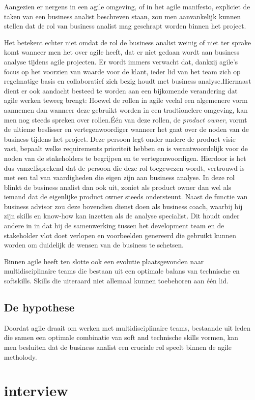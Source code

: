 \documentclass{hogent-article}
\begin{document}
Aangezien er nergens in een agile omgeving, of in het agile manifesto, expliciet de taken van een business analist beschreven staan, zou men aanvankelijk kunnen stellen dat de rol van business analist mag geschrapt worden binnen het project.

Het betekent echter niet omdat de rol de business analist weinig of niet ter sprake komt wanneer men het over agile heeft, dat er niet gedaan wordt aan business analyse tijdens agile projecten. Er wordt immers verwacht dat, dankzij agile's focus op het voorzien van waarde voor de klant, ieder lid van het team zich op regelmatige basis en collaboratief zich bezig houdt met business analyse.Hiernaast dient er ook aandacht besteed te worden aan een bijkomende verandering dat agile werken teweeg brengt: Hoewel de rollen in agile veelal een algemenere vorm aannemen dan wanneer deze gebruikt worden in een tradtionelere omgeving, kan men nog steeds spreken over rollen.Één van deze rollen, de \emph{product owner}, vormt de ultieme beslisser en vertegenwoordiger wanneer het gaat over de noden van de business tijdens het project. Deze persoon legt onder andere de product visie vast, bepaalt welke requirements prioriteit hebben en is verantwoordelijk voor de noden van de stakeholders te begrijpen en te vertegenwoordigen. Hierdoor is het dus vanzelfsprekend dat de persoon die deze rol toegewezen wordt, vertrouwd is met een tal van vaardigheden die eigen zijn aan business analyse. In deze rol blinkt de business analist dan ook uit, zoniet als product owner dan wel als iemand dat de eigenlijke product owner steeds ondersteunt. Naast de functie van business advisor zou deze bovendien dienst doen als business coach, waarbij hij zijn skills en know-how kan inzetten als de analyse specialist. Dit houdt onder andere in in dat hij de samenwerking tussen het development team en de stakeholder vlot doet verlopen en voorbeelden genereerd die gebruikt kunnen worden om duidelijk de wensen van de business te schetsen.\autocite{mcdonald2017does}

Binnen agile heeft ten slotte ook een evolutie plaatsgevonden naar multidisciplinaire teams die bestaan uit een optimale balans van technische en softskills. Skills die uiteraard niet allemaal kunnen toebehoren aan één lid.\autocite{heijnerelevante}

\subsection{De hypothese}

Doordat agile draait om werken met multidisciplinaire teams, bestaande uit leden die samen een optimale combinatie van soft and technische skills vormen, kan men besluiten dat de business analist een cruciale rol speelt binnen de agile metholody. 


\section{interview}








\printbibliography[heading=bibintoc]
\end{document}
